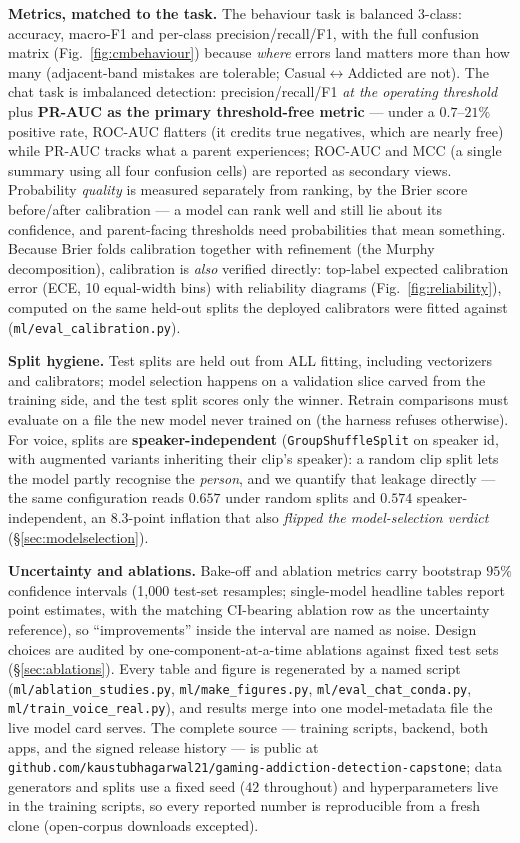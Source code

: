 \documentclass[11pt,a4paper]{article}
\begin{document}
\textbf{Metrics, matched to the task.} The behaviour task is balanced 3-class:
accuracy, macro-F1 and per-class precision/recall/F1, with the full confusion matrix
(Fig.~\ref{fig:cmbehaviour}) because \emph{where} errors land matters more than how
many (adjacent-band mistakes are tolerable; Casual$\leftrightarrow$Addicted are not).
The chat task is imbalanced detection: precision/recall/F1 \emph{at the operating
threshold} plus \textbf{PR-AUC as the primary threshold-free metric} --- under a
$0.7$--$21\%$ positive rate, ROC-AUC flatters (it credits true negatives, which are
nearly free) while PR-AUC tracks what a parent experiences; ROC-AUC and MCC (a
single summary using all four confusion cells) are reported as secondary views.
Probability \emph{quality} is measured separately from ranking, by the Brier score
before/after calibration --- a model can rank well and still lie about its
confidence, and parent-facing thresholds need probabilities that mean something.
Because Brier folds calibration together with refinement (the Murphy
decomposition), calibration is \emph{also} verified directly: top-label expected
calibration error (ECE, 10 equal-width bins) with reliability diagrams
(Fig.~\ref{fig:reliability}), computed on the same held-out splits the deployed
calibrators were fitted against (\texttt{ml/eval\_calibration.py}).

\textbf{Split hygiene.} Test splits are held out from ALL fitting, including
vectorizers and calibrators; model selection happens on a validation slice carved
from the training side, and the test split scores only the winner. Retrain
comparisons must evaluate on a file the new model never trained on (the harness
refuses otherwise). For voice, splits are \textbf{speaker-independent}
(\texttt{GroupShuffleSplit} on speaker id, with augmented variants inheriting their
clip's speaker): a random clip split lets the model partly recognise the
\emph{person}, and we quantify that leakage directly --- the same configuration
reads $0.657$ under random splits and $0.574$ speaker-independent, an $8.3$-point
inflation that also \emph{flipped the model-selection verdict}
(\S\ref{sec:modelselection}).

\textbf{Uncertainty and ablations.} Bake-off and ablation metrics carry bootstrap $95\%$
confidence intervals (1{,}000 test-set resamples; single-model headline tables report
point estimates, with the matching CI-bearing ablation row as the uncertainty
reference), so ``improvements'' inside the
interval are named as noise. Design choices are audited by one-component-at-a-time
ablations against fixed test sets (\S\ref{sec:ablations}). Every table and figure is
regenerated by a named script (\texttt{ml/ablation\_studies.py},
\texttt{ml/make\_figures.py}, \texttt{ml/eval\_chat\_conda.py},
\texttt{ml/train\_voice\_real.py}), and results merge into one model-metadata file
the live model card serves. The complete source --- training scripts, backend, both
apps, and the signed release history --- is public at
\texttt{github.com/kaustubhagarwal21/gaming-addiction-detection-capstone}; data
generators and splits use a fixed seed ($42$ throughout) and hyperparameters live in
the training scripts, so every reported number is reproducible from a fresh clone
(open-corpus downloads excepted).
\end{document}
